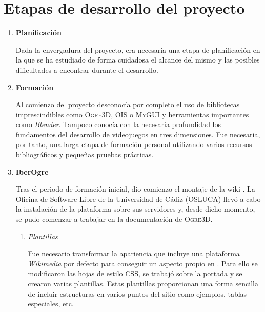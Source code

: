 \section{Etapas de desarrollo del proyecto}

\begin{enumerate}
    \itemsep0em
    \item \textbf{Planificación}
    
    Dada la envergadura del proyecto, era necesaria
    una etapa de planificación en la que se ha estudiado de forma cuidadosa
    el alcance del mismo y las posibles dificultades a encontrar durante
    el desarrollo.\\
    
    \item \textbf{Formación}
    
    Al comienzo del proyecto desconocía por completo
    el uso de bibliotecas imprescindibles como \textsc{Ogre3D}, \textsc{OIS} o
    \textsc{MyGUI} y herramientas importantes como \textit{Blender}. Tampoco
    conocía con la necesaria profundidad los fundamentos del desarrollo
    de videojuegos en tres dimensiones. Fue necesaria, por tanto,
    una larga etapa de formación personal utilizando varios recursos bibliográficos
    y pequeñas pruebas prácticas.\\
    
    \item \textbf{IberOgre}
    
    Tras el periodo de formación inicial, dio comienzo el montaje de la wiki
    \wiki. La Oficina de Software Libre de la Universidad de Cádiz (OSLUCA)
    llevó a cabo la instalación de la plataforma sobre sus servidores y,
    desde dicho momento, se pudo comenzar a trabajar en la documentación
    de \textsc{Ogre3D}.
    
    \begin{enumerate}
        \itemsep0em
        \item \textit{Plantillas}
        
        Fue necesario transformar la apariencia que incluye una plataforma
        \textit{Wikimedia} por defecto para conseguir un aspecto propio
        en \wiki. Para ello se modificaron las hojas de estilo \textsc{CSS},
        se trabajó sobre la portada y se crearon varias plantillas. Estas
        plantillas proporcionan una forma sencilla de incluir estructuras
        en varios puntos del sitio como ejemplos, tablas especiales, etc.\\
        

\end{enumerate}
\end{enumerate}
